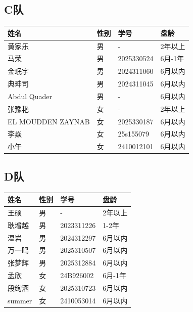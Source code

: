 \documentclass{ctexart}
\begin{document}
\subsection*{C队}
\renewcommand{\arraystretch}{1.2}
\begin{tabularx}{\textwidth}{@{} L{4.5cm} M{1.4cm} L{3cm} X @{}}
    \toprule
    \textbf{姓名} & \textbf{性别} & \textbf{学号} & \textbf{盘龄} \\
    \midrule
    黄家乐 & 男 & - & 2年以上 \\
    马荣 & 男 & 2025330524 & 6月-1年 \\
    金珉宇 & 男 & 2024311060 & 6月以内 \\
    典珅司 & 男 & 2024311045 & 6月以内 \\
    Abdul Quader & 男 & - & 6月以内 \\
    张豫艳 & 女 & - & 2年以上 \\
    EL MOUDDEN ZAYNAB & 女 & 2025330187 & 6月以内 \\
    李焱 & 女 & 25s155079 & 6月以内 \\
    小午 & 女 & 2410012101 & 6月以内 \\
    \bottomrule
\end{tabularx}

\subsection*{D队}
\renewcommand{\arraystretch}{1.2}
\begin{tabularx}{\textwidth}{@{} L{4.5cm} M{1.4cm} L{3cm} X @{}}
    \toprule
    \textbf{姓名} & \textbf{性别} & \textbf{学号} & \textbf{盘龄} \\
    \midrule
    王硕 & 男 & - & 2年以上 \\
    耿增越 & 男 & 2023311226 & 1-2年 \\
    温岩 & 男 & 2024312297 & 6月以内 \\
    万一鸣 & 男 & 2025310507 & 6月以内 \\
    张梦辉 & 男 & 2025312884 & 6月以内 \\
    孟欣 & 女 & 24B926002 & 6月-1年 \\
    段绚涵 & 女 & 2025310723 & 6月以内 \\
    summer & 女 & 2410053014 & 6月以内 \\
    \bottomrule
\end{tabularx}
\end{document}
